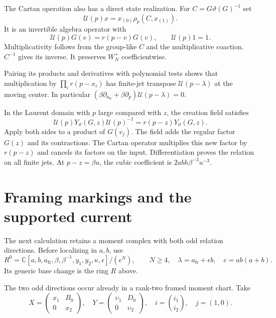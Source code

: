 The Cartan operation also has a direct state realization.
For $C=G\vartheta(G)^{-1}$ set
\[
 \mathcal U(p)x=x_{(0)}\rho_p(C,x_{(1)}).
\]
It is an invertible algebra operator with
\[
 \mathcal U(p)G(v)=r(p-v)G(v),\qquad \mathcal U(p)1=1.
\]
Multiplicativity follows from the group-like $C$ and
the multiplicative coaction. $C^{-1}$ gives its inverse.
It preserves $W_N^+$ coefficientwise.

Pairing its products
and derivatives with polynomial tests shows that multiplication
by $\prod_i r(p-x_i)$ has finite-jet transpose
$\mathcal U(p-\lambda)$ at the moving center. In particular
$(\beta\partial_{a_{\mathrm{fr}}}+\beta\partial_p)
 \mathcal U(p-\lambda)=0$.

In the Laurent domain with $p$ large compared with $z$,
the creation field satisfies
\begin{equation}\label{v4-arith:curve:eq:cartan-covariance}
 \mathcal U(p)Y_\vartheta(G,z)\mathcal U(p)^{-1}
       =r(p-z)Y_\vartheta(G,z).
\end{equation}
Apply both sides to a product of $G(v_j)$.
The field adds the regular factor $G(z)$ and its
contractions. The Cartan operator multiplies this new
factor by $r(p-z)$ and cancels its factors on the input.
Differentiation proves the relation on all finite jets.
At $p-z=\beta u$, the cubic coefficient is
$2abh\beta^{-3}u^{-3}$.

\section{Framing markings and the supported current}
\label{v4-arith:curve:sec:framing}

The next calculation retains a moment complex with both
odd relation directions. Before localizing in $a,b$, use
\[
 R^0=\mathbb C[a,b,a_{\mathrm{fr}},\beta,\beta^{-1},
                   y_1,y_2,\kappa,\epsilon]/(\epsilon^N),
 \qquad N\geq4,\quad \lambda=a_{\mathrm{fr}}+\epsilon b,
 \quad c=ab(a+b).
\]
Its generic base change is the ring $R$ above.

The two odd directions occur already in a rank-two
framed moment chart. Take
\[
 X=\begin{pmatrix}x_1&B_0\\0&x_2\end{pmatrix},\quad
 Y=\begin{pmatrix}\upsilon_1&D_0\\0&\upsilon_2\end{pmatrix},
 \quad i=\binom{i_1}{i_2},\quad j=(1,0).
\]


